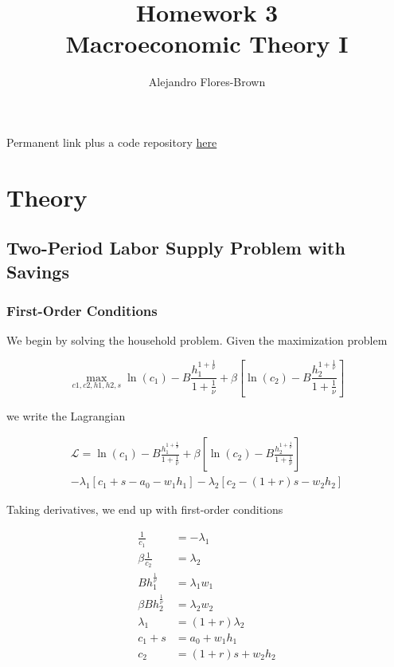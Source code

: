 \documentclass[12pt, letterpaper, parskip = full]{article}
\title{Homework 3 \\ Macroeconomic Theory I}
\author{Alejandro Flores-Brown}
\begin{document}
	\maketitle

    Permanent link plus a code repository \href{https://github.com/AFB-TUV/Fall-2026/tree/main/Macro/Homework%203}{here}

    \section{Theory}

    \subsection{Two-Period Labor Supply Problem with Savings}

    \subsubsection{First-Order Conditions}

    We begin by solving the household problem. Given the maximization problem

    \[ \max_{c1, c2, h1, h2, s}{\ln(c_1) - B \frac{h_1^{1 + \frac{1}{\nu}}}{1 + \frac{1}{\nu}} + \beta \left[ \ln(c_2) - B \frac{h_2^{1 + \frac{1}{\nu}}}{1 + \frac{1}{\nu}} \right]}   \]

    we write the Lagrangian

    \begin{align*}
    \mathcal{L} = \ln(c_1) - B \frac{h_1^{1 + \frac{1}{\nu}}}{1 + \frac{1}{\nu}} + \beta \left[ \ln(c_2) - B \frac{h_2^{1 + \frac{1}{\nu}}}{1 + \frac{1}{\nu}} \right] \\ - \lambda_1 \left[ c_1 + s - a_0 - w_1 h_1 \right] - \lambda_2 \left[ c_2 - (1+r) s - w_2 h_2 \right]
    \end{align*}

    Taking derivatives, we end up with first-order conditions

    \begin{align*}
        \frac{1}{c_1} &= - \lambda_1 \\
        \beta \frac{1}{c_2} &= \lambda_2 \\
        B h_1^{\frac{1}{\nu}} &= \lambda_1 w_1 \\
        \beta B h_2^{\frac{1}{\nu}} &= \lambda_2 w_2 \\
        \lambda_1 &= (1 + r) \lambda_2 \\
        c_1 + s &= a_0 + w_1 h_1 \\
        c_2  &= (1+r) s + w_2 h_2
    \end{align*}
\end{document}
